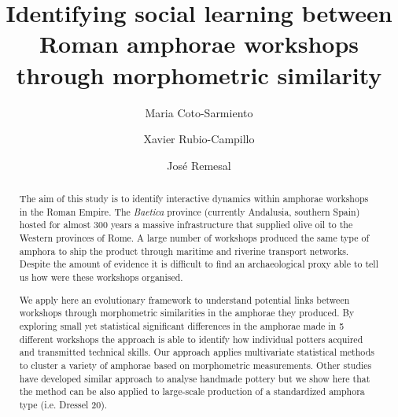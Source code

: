 \documentclass[review]{elsarticle}
\begin{document}
\begin{frontmatter}

\title{Identifying social learning between Roman amphorae workshops through morphometric similarity}

\author[bscadress]{Maria Coto-Sarmiento}


\author[edadress]{Xavier Rubio-Campillo}
\author[ceipacadress]{Jos\'e Remesal}




\address[bscadress]{Barcelona Supercomputing Center (BSC), Jordi Girona 29, Office 3A, Nexus II Building, 08034, Barcelona, Spain}
\address[edadress]{School of History, Classic \& Archaeology, Room OOM.22, William Robertson Wing, Old Medical School, Teviot Place, University of Edinburgh, UK}
\address[ceipacadress]{CEIPAC, Department of Prehistory and Archaeology, Montalegre, 6-8, 08001, University of Barcelona, Barcelona, Spain}

\begin{abstract}

The aim of this study is to identify interactive dynamics within amphorae workshops in the Roman Empire. The \textit{Baetica} province (currently Andalusia, southern Spain) hosted for almost 300 years a massive infrastructure that supplied olive oil to the Western provinces of Rome. A large number of workshops produced the same type of amphora to ship the product through maritime and riverine transport networks. Despite the amount of evidence it is difficult to find an archaeological proxy able to tell us how were these workshops organised.

We apply here an evolutionary framework to understand potential links between workshops through morphometric similarities in the amphorae they produced. By exploring small yet statistical significant differences in the amphorae made in 5 different workshops the approach is able to identify how individual potters acquired and transmitted technical skills.  Our approach applies multivariate statistical methods to cluster a variety of amphorae based on morphometric measurements. Other studies have developed similar approach to analyse handmade pottery but we show here that the method can be also applied to large-scale production of a standardized amphora type (i.e. Dressel 20).


\end{abstract}
\end{frontmatter}
\end{document}
